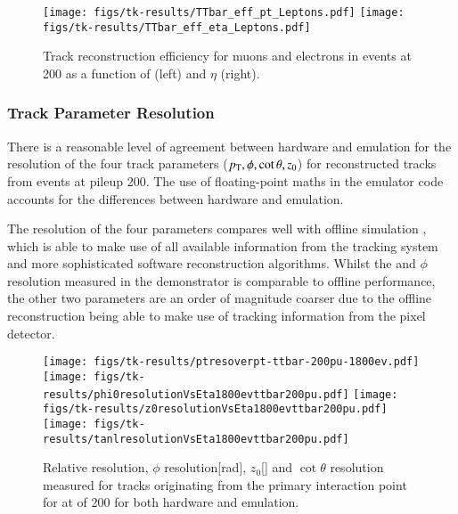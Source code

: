 \begin{figure}[!t]
\centering
\texttt{[image: figs/tk-results/TTbar\_eff\_pt\_Leptons.pdf]}
\hfill
\texttt{[image: figs/tk-results/TTbar\_eff\_eta\_Leptons.pdf]}
\caption{Track reconstruction efficiency for muons and electrons in \ttbar events at 200 \PU as a function of \pt (left) and $\eta$ (right).}
\label{fig:leptonEffPlots}
\end{figure}

\subsubsection{Track Parameter Resolution}
There is a reasonable level of agreement between hardware and emulation for the resolution of the four track parameters ($p_{\mathrm{T}}, \phi, \cot{\theta}, z_0$) for reconstructed tracks from \ttbar events at pileup 200. The use of floating-point maths in the emulator code accounts for the differences between hardware and emulation. 

The resolution of the four parameters compares well with offline simulation \cite{CMS_Upgrade_TP}, which is able to make use of all available information from the tracking system and more sophisticated software reconstruction algorithms. Whilst the \pt and $\phi$ resolution measured in the demonstrator is comparable to offline performance, the other two parameters are an order of magnitude coarser due to the offline reconstruction being able to make use of tracking information from the pixel detector.

\begin{figure}[!t]
\centering
\texttt{[image: figs/tk-results/ptresoverpt-ttbar-200pu-1800ev.pdf]}
\texttt{[image: figs/tk-results/phi0resolutionVsEta1800evttbar200pu.pdf]}
\texttt{[image: figs/tk-results/z0resolutionVsEta1800evttbar200pu.pdf]}
\texttt{[image: figs/tk-results/tanlresolutionVsEta1800evttbar200pu.pdf]}
\caption{Relative \pt resolution, $\phi$ resolution[rad], $z_0$[\cm] and $\cot{\theta}$ resolution measured for tracks originating from the primary interaction point for \ttbar at \PU of 200 for both hardware and emulation.}
\label{fig:resolutionPlots}
\end{figure}

